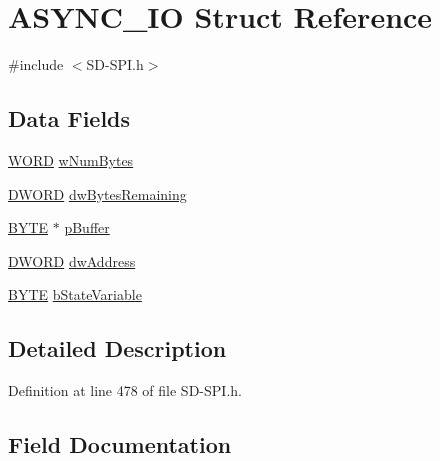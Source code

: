 \hypertarget{struct_a_s_y_n_c___i_o}{}\section{A\+S\+Y\+N\+C\+\_\+\+I\+O Struct Reference}
\label{struct_a_s_y_n_c___i_o}


{\ttfamily \#include $<$S\+D-\/\+S\+P\+I.\+h$>$}

\subsection*{Data Fields}
\begin{DoxyCompactItemize}
\item 
\hyperlink{_generic_type_defs_8h_a2b0e863dadf920709ec53d9088ee7c91}{W\+O\+R\+D} \hyperlink{struct_a_s_y_n_c___i_o_a9131e939b85942d556649db37be08d0e}{w\+Num\+Bytes}
\item 
\hyperlink{_generic_type_defs_8h_ad342ac907eb044443153a22f964bf0af}{D\+W\+O\+R\+D} \hyperlink{struct_a_s_y_n_c___i_o_acc2d44adcb63a5043c9bda3e648abb00}{dw\+Bytes\+Remaining}
\item 
\hyperlink{_generic_type_defs_8h_a4ae1dab0fb4b072a66584546209e7d58}{B\+Y\+T\+E} $\ast$ \hyperlink{struct_a_s_y_n_c___i_o_a81bba27029571d8801e39f24898ddaa0}{p\+Buffer}
\item 
\hyperlink{_generic_type_defs_8h_ad342ac907eb044443153a22f964bf0af}{D\+W\+O\+R\+D} \hyperlink{struct_a_s_y_n_c___i_o_afbbec435d6d7895aa7ed48ba5f5a6ff0}{dw\+Address}
\item 
\hyperlink{_generic_type_defs_8h_a4ae1dab0fb4b072a66584546209e7d58}{B\+Y\+T\+E} \hyperlink{struct_a_s_y_n_c___i_o_ac55ebddf89ed4c02fd8d64362b4acd5c}{b\+State\+Variable}
\end{DoxyCompactItemize}


\subsection{Detailed Description}


Definition at line 478 of file S\+D-\/\+S\+P\+I.\+h.



\subsection{Field Documentation}
\hypertarget{struct_a_s_y_n_c___i_o_ac55ebddf89ed4c02fd8d64362b4acd5c}{}
